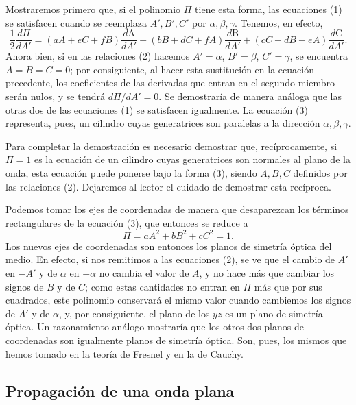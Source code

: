 Mostraremos primero que, si el polinomio $\Pi$ tiene esta forma, las
ecuaciones (1) se satisfacen cuando se reemplaza $A',B',C'$ por
$\alpha,\beta,\gamma$. Tenemos, en efecto,
\[
\frac{1}{2}\frac{d\Pi}{dA'}=(aA+eC+fB)\frac{d\mathrm A}{dA'}
+(bB+dC+fA)\frac{d\mathrm B}{dA'}+(cC+dB+eA)\frac{d\mathrm C}{dA'}.
\]
Ahora bien, si en las relaciones (2) hacemos $A'=\alpha$, $B'=\beta$,
$C'=\gamma$, se encuentra $A=B=C=0$; por consiguiente, al hacer esta
sustitución en la ecuación precedente, los coeficientes de las derivadas
que entran en el segundo miembro serán nulos, y se tendrá
$d\Pi/dA'=0$. Se demostraría de manera análoga que las otras dos de las
ecuaciones (1) se satisfacen igualmente. La ecuación (3) representa, pues,
un cilindro cuyas generatrices son paralelas a la dirección
$\alpha,\beta,\gamma$.

Para completar la demostración es necesario demostrar que, recíprocamente,
si $\Pi=1$ es la ecuación de un cilindro cuyas generatrices son normales
al plano de la onda, esta ecuación puede ponerse bajo la forma (3), siendo
$A,B,C$ definidos por las relaciones (2). Dejaremos al lector el cuidado
de demostrar esta recíproca.

Podemos tomar los ejes de coordenadas de manera que desaparezcan los
términos rectangulares de la ecuación (3), que entonces se reduce a
\begin{equation}
\Pi=aA^2+bB^2+cC^2=1.
\tag{4}
\end{equation}
Los nuevos ejes de coordenadas son entonces los planos de simetría óptica
del medio. En efecto, si nos remitimos a las ecuaciones (2), se ve que el
cambio de $A'$ en $-A'$ y de $\alpha$ en $-\alpha$ no cambia el valor de
$A$, y no hace más que cambiar los signos de $B$ y de $C$; como estas
cantidades no entran en $\Pi$ más que por sus cuadrados, este polinomio
conservará el mismo valor cuando cambiemos los signos de $A'$ y de
$\alpha$, y, por consiguiente, el plano de los $yz$ es un plano de
simetría óptica. Un razonamiento análogo mostraría que los otros dos
planos de coordenadas son igualmente planos de simetría óptica. Son,
pues, los mismos que hemos tomado en la teoría de Fresnel y en la de
Cauchy.

\subsection{Propagación de una onda plana}

